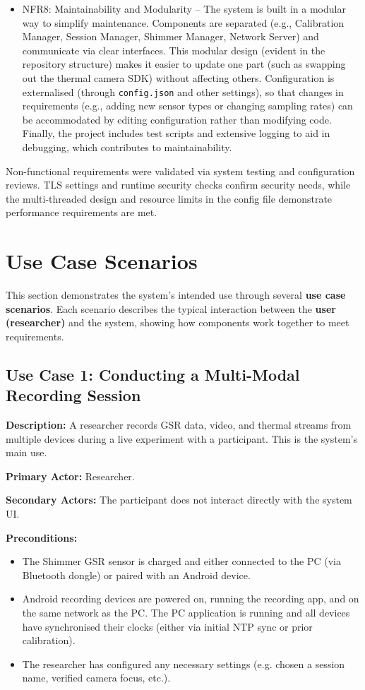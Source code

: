 \begin{itemize}
    \item NFR8: Maintainability and Modularity -- The system is built in a modular way to simplify maintenance. Components are separated (e.g., Calibration Manager, Session Manager, Shimmer Manager, Network Server) and communicate via clear interfaces. This modular design (evident in the repository structure) makes it easier to update one part (such as swapping out the thermal camera SDK) without affecting others. Configuration is externalised (through \texttt{config.json} and other settings), so that changes in requirements (e.g., adding new sensor types or changing sampling rates) can be accommodated by editing configuration rather than modifying code. Finally, the project includes test scripts and extensive logging to aid in debugging, which contributes to maintainability.
\end{itemize}

Non-functional requirements were validated via system testing and configuration reviews. TLS settings and runtime security checks confirm security needs, while the multi-threaded design and resource limits in the config file demonstrate performance requirements are met.


\section{Use Case Scenarios}
This section demonstrates the system's intended use through several \textbf{use case scenarios}. Each scenario describes the typical interaction between the \textbf{user (researcher)} and the system, showing how components work together to meet requirements.

\subsection{Use Case 1: Conducting a Multi-Modal Recording Session}
\textbf{Description:} A researcher records GSR data, video, and thermal streams from multiple devices during a live experiment with a participant. This is the system's main use.

\textbf{Primary Actor:} Researcher.

\textbf{Secondary Actors:} The participant does not interact directly with the system UI.

\textbf{Preconditions:}
\begin{itemize}
    \item The Shimmer GSR sensor is charged and either connected to the PC (via Bluetooth dongle) or paired with an Android device.
    \item Android recording devices are powered on, running the recording app, and on the same network as the PC. The PC application is running and all devices have synchronised their clocks (either via initial NTP sync or prior calibration).
    \item The researcher has configured any necessary settings (e.g. chosen a session name, verified camera focus, etc.).
\end{itemize}

